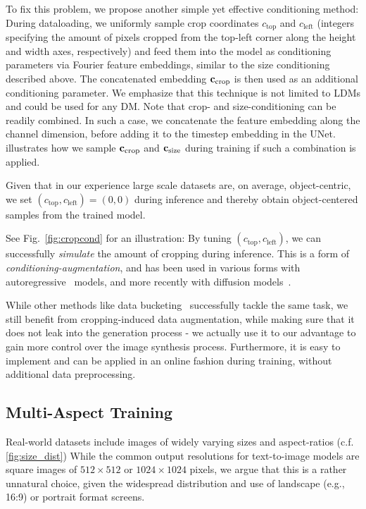 \documentclass{article}
\begin{document}
To fix this problem, we propose another simple yet effective conditioning method: During dataloading, we uniformly sample crop coordinates $c_{\text{top}}$ and $c_{\text{left}}$ (integers specifying the amount of pixels cropped from the top-left corner along the height and width axes, respectively) and feed them into the model as conditioning parameters via Fourier feature embeddings, similar to the size conditioning described above. The concatenated embedding $\mathbf{c}_{\text{crop}}$ is then used as an additional conditioning parameter. We emphasize that this technique is not limited to LDMs and could be used for any DM.
%
Note that crop- and size-conditioning can be readily combined. In such a case, we concatenate the feature embedding along the channel dimension, before adding it to the timestep embedding in the UNet.  illustrates how we sample $\mathbf{c}_{\text{crop}}$ and $\mathbf{c}_{\text{size}}$ during training if such a combination is applied.
\condaug
%
%
%
%
%


Given that in our experience large scale datasets are, on average, object-centric, we %
%
set $\left(c_{\text{top}}, c_{\text{left}}\right) = \left(0, 0\right)$ during inference and thereby obtain object-centered samples from the trained model.

%

%
\cropcondvtwo
See Fig.~\ref{fig:cropcond} for an illustration: By tuning $\left(c_{\text{top}}, c_{\text{left}}\right)$, we can successfully \emph{simulate} the amount of cropping during inference. This is a form of \emph{conditioning-augmentation}, and has been used in various forms with autoregressive~\cite{jun2020distribution} models, %
and more recently with diffusion models~\cite{karras2022elucidating}. 

While other methods like data bucketing~\cite{novelai2023novelai} successfully tackle the same task, we still benefit from cropping-induced data augmentation, while making sure that it does not leak into the generation process - we actually use it to our advantage to gain more control over the image synthesis process. Furthermore, it is easy to implement and can be applied in an online fashion during training, without additional data preprocessing.

%
%
%

%
%
%

%

%

\subsection{Multi-Aspect Training}
\label{subsec:mar}
Real-world datasets include images of widely varying sizes and aspect-ratios (c.f. \cref{fig:size_dist}) While the common output resolutions for text-to-image models are square images of $512\times512$ or $1024\times1024$ pixels, we argue that this is a rather unnatural choice, given the widespread distribution and use of landscape (e.g., 16:9) or portrait format screens. %
\end{document}

